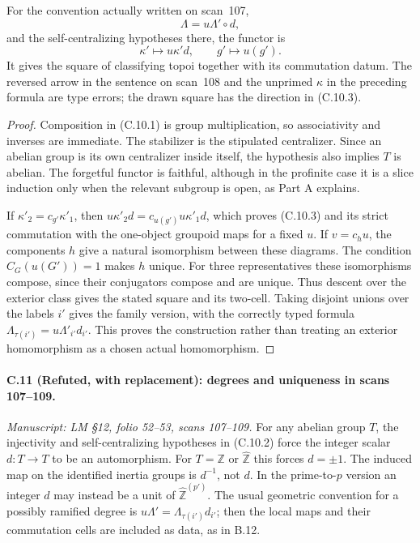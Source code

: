 For the convention actually written
on scan~107,
\[
 \Lambda=u\Lambda'\circ d,
                                                               \tag{C.10.2}
\]
and the self-centralizing hypotheses
there, the functor is
\[
 \kappa'\longmapsto u\kappa' d,
      \qquad g'\longmapsto u(g').
                                                               \tag{C.10.3}
\]
It gives the square of classifying
topoi together with its commutation
datum. The reversed arrow in the
sentence on scan~108 and the unprimed
$\kappa$ in the preceding formula are
type errors; the drawn square has
the direction in (C.10.3).

\begin{proof}
Composition in (C.10.1) is group
multiplication, so associativity and
inverses are immediate. The stabilizer
is the stipulated centralizer. Since
an abelian group is its own centralizer
inside itself, the hypothesis also
implies $T$ is abelian. The forgetful
functor is faithful, although in the
profinite case it is a slice induction
only when the relevant subgroup is
open, as Part A explains.

If $\kappa'_2=c_{g'}\kappa'_1$, then
$u\kappa'_2d=c_{u(g')}u\kappa'_1d$,
which proves (C.10.3) and its strict
commutation with the one-object
groupoid maps for a fixed $u$.
If $v=c_hu$, the components $h$
give a natural isomorphism between
these diagrams. The condition
$C_G(u(G'))=1$ makes $h$ unique.
For three representatives these
isomorphisms compose, since their
conjugators compose and are unique.
Thus descent over the exterior class
gives the stated square and its
two-cell. Taking disjoint unions over
the labels $i'$ gives the family
version, with the correctly typed
formula $\Lambda_{\tau(i')}=u\Lambda'_{i'}d_{i'}$.
This proves the construction rather
than treating an exterior homomorphism
as a chosen actual homomorphism.
\end{proof}

\paragraph{C.11 (Refuted, with replacement): degrees and uniqueness in scans 107--109.}\label{C11}
\textit{Manuscript: LM \S12, folio 52--53, scans 107--109.}
For any abelian group $T$, the injectivity and
self-centralizing hypotheses in (C.10.2) force the
integer scalar $d:T\to T$ to be an automorphism.
For $T=\mathbb Z$ or $\widehat{\mathbb Z}$ this forces
$d=\pm1$. The induced map on the
identified inertia groups is $d^{-1}$,
not $d$. In the prime-to-$p$ version
an integer $d$ may instead be a
unit of $\widehat{\mathbb Z}^{(p')}$.
The usual geometric convention for
a possibly ramified degree is
$u\Lambda'=\Lambda_{\tau(i')}d_{i'}$;
then the local maps and their
commutation cells are included as
data, as in B.12.

